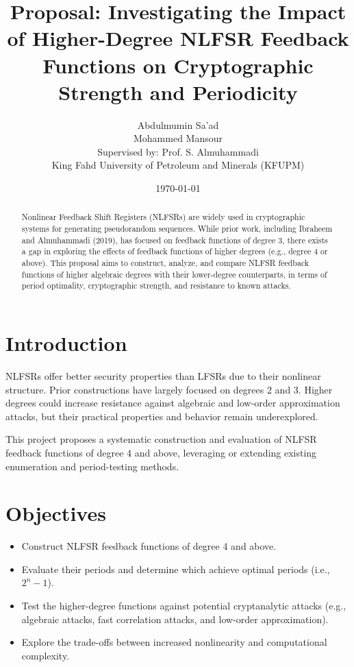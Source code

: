 \documentclass[11pt]{article}
\title{Proposal: Investigating the Impact of Higher-Degree NLFSR Feedback Functions on Cryptographic Strength and Periodicity}
\author{
    Abdulmumin Sa'ad \\ 
    Mohammed Mansour \\
    Supervised by: Prof. S. Almuhammadi \\
    King Fahd University of Petroleum and Minerals (KFUPM)
}
\date{\today}
\begin{document}
\maketitle

\begin{abstract}
Nonlinear Feedback Shift Registers (NLFSRs) are widely used in cryptographic systems for generating pseudorandom sequences. While prior work, including Ibraheem and Almuhammadi (2019), has focused on feedback functions of degree 3, there exists a gap in exploring the effects of feedback functions of higher degrees (e.g., degree 4 or above). This proposal aims to construct, analyze, and compare NLFSR feedback functions of higher algebraic degrees with their lower-degree counterparts, in terms of period optimality, cryptographic strength, and resistance to known attacks.
\end{abstract}

\section{Introduction}
NLFSRs offer better security properties than LFSRs due to their nonlinear structure. Prior constructions have largely focused on degrees 2 and 3. Higher degrees could increase resistance against algebraic and low-order approximation attacks, but their practical properties and behavior remain underexplored.

This project proposes a systematic construction and evaluation of NLFSR feedback functions of degree 4 and above, leveraging or extending existing enumeration and period-testing methods.

\section{Objectives}
\begin{itemize}
    \item Construct NLFSR feedback functions of degree 4 and above.
    \item Evaluate their periods and determine which achieve optimal periods (i.e., $2^n - 1$).
    \item Test the higher-degree functions against potential cryptanalytic attacks (e.g., algebraic attacks, fast correlation attacks, and low-order approximation).
    \item Explore the trade-offs between increased nonlinearity and computational complexity.
\end{itemize}
\end{document}
